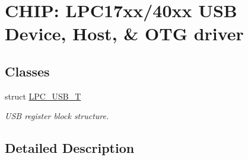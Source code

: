 \hypertarget{group__USB__17XX__40XX}{}\section{C\+H\+IP\+: L\+P\+C17xx/40xx U\+SB Device, Host, \& O\+TG driver}
\label{group__USB__17XX__40XX}
\subsection*{Classes}
\begin{DoxyCompactItemize}
\item 
struct \hyperlink{structLPC__USB__T}{L\+P\+C\+\_\+\+U\+S\+B\+\_\+T}
\begin{DoxyCompactList}\small\item\em U\+SB register block structure. \end{DoxyCompactList}\end{DoxyCompactItemize}


\subsection{Detailed Description}
